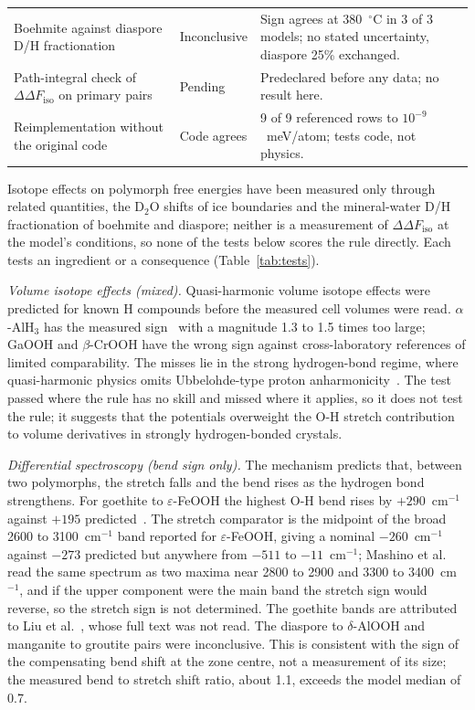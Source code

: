 \documentclass[aps,prmaterials,reprint,superscriptaddress,nofootinbib]{revtex4-2}
\newcommand{\ddF}{\Delta\Delta F_{\mathrm{iso}}}
\begin{document}
\begin{table}[t]
\begin{ruledtabular}
\begin{tabular}{p{}p{}p{}}
Boehmite against diaspore D/H fractionation & Inconclusive & Sign agrees at 380~$^\circ$C in 3 of 3 models; no stated uncertainty, diaspore 25\% exchanged. \\
Path-integral check of $\ddF$ on primary pairs & Pending & Predeclared before any data; no result here. \\
Reimplementation without the original code & Code agrees & 9 of 9 referenced rows to $10^{-9}$~meV/atom; tests code, not physics. \\
\end{tabular}
\end{ruledtabular}
\end{table}

Isotope effects on polymorph free energies have been measured only through related quantities, the D$_2$O shifts of ice boundaries and the mineral-water D/H fractionation of boehmite and diaspore; neither is a measurement of $\ddF$ at the model's conditions, so none of the tests below scores the rule directly. Each tests an ingredient or a consequence (Table~\ref{tab:tests}).

\textit{Volume isotope effects (mixed).} Quasi-harmonic volume isotope effects were predicted for known H compounds before the measured cell volumes were read. $\alpha$-AlH$_3$ has the measured sign~\cite{Turley1969} with a magnitude 1.3 to 1.5 times too large; GaOOH and $\beta$-CrOOH have the wrong sign against cross-laboratory references of limited comparability. The misses lie in the strong hydrogen-bond regime, where quasi-harmonic physics omits Ubbelohde-type proton anharmonicity~\cite{Ubbelohde1955}. The test passed where the rule has no skill and missed where it applies, so it does not test the rule; it suggests that the potentials overweight the O-H stretch contribution to volume derivatives in strongly hydrogen-bonded crystals.

\textit{Differential spectroscopy (bend sign only).} The mechanism predicts that, between two polymorphs, the stretch falls and the bend rises as the hydrogen bond strengthens. For goethite to $\varepsilon$-FeOOH the highest O-H bend rises by $+290$~cm$^{-1}$ against $+195$ predicted~\cite{Thompson2020}. The stretch comparator is the midpoint of the broad 2600 to 3100~cm$^{-1}$ band reported for $\varepsilon$-FeOOH, giving a nominal $-260$~cm$^{-1}$ against $-273$ predicted but anywhere from $-511$ to $-11$~cm$^{-1}$; Mashino et al.~\cite{Mashino2026} read the same spectrum as two maxima near 2800 to 2900 and 3300 to 3400~cm$^{-1}$, and if the upper component were the main band the stretch sign would reverse, so the stretch sign is not determined. The goethite bands are attributed to Liu et al.~\cite{Liu2013}, whose full text was not read. The diaspore to $\delta$-AlOOH and manganite to groutite pairs were inconclusive. This is consistent with the sign of the compensating bend shift at the zone centre, not a measurement of its size; the measured bend to stretch shift ratio, about 1.1, exceeds the model median of 0.7.
\end{document}
